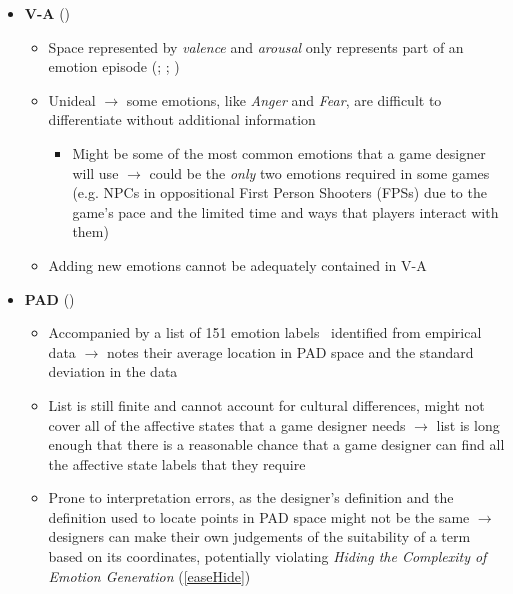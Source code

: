 \begin{itemize}
    \item \textbf{V-A} (\weak)
    \begin{itemize}
        \item Space represented by \textit{valence} and \textit{arousal} only
        represents part of an emotion episode (;
        ; )

        \item Unideal $\rightarrow$ some emotions, like \textit{Anger} and
        \textit{Fear}, are difficult to differentiate without additional
        information
        \begin{itemize}
            \item Might be some of the most common emotions that a game
            designer will use $\rightarrow$ could be the \textit{only} two
            emotions required in some games (e.g. NPCs in oppositional
            First Person Shooters (FPSs) due to the game's pace and the
            limited time and ways that players interact with them)
        \end{itemize}

        \item Adding new emotions cannot be adequately contained in V-A
    \end{itemize}

    \item \textbf{PAD} (\good)
    \begin{itemize}
        \item Accompanied by a list of 151 emotion
        labels~\citep[p.~42--45]{mehrabian1980basic} identified from empirical
        data $\rightarrow$ notes their average location in PAD space and the
        standard deviation in the data

        \item List is still finite and cannot account for cultural differences,
        might not cover all of the affective states that a game designer needs
        $\rightarrow$ list is long enough that there is a reasonable chance
        that a game designer can find all the affective state labels that they
        require

        \item Prone to interpretation errors, as the designer's definition and
        the definition used to locate points in PAD space might not be the same
        $\rightarrow$ designers can make their own judgements of the
        suitability of a term based on its coordinates, potentially violating
        \textit{Hiding the Complexity of Emotion Generation} (\ref{easeHide})
    \end{itemize}
\end{itemize}

